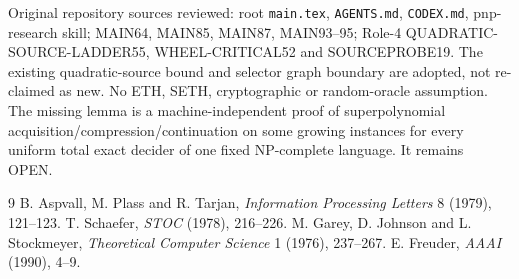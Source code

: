 \documentclass[11pt]{article}
\begin{document}
Original repository sources reviewed: root \texttt{main.tex}, \texttt{AGENTS.md}, \texttt{CODEX.md}, pnp-research skill; MAIN64, MAIN85, MAIN87, MAIN93--95; Role-4 QUADRATIC-SOURCE-LADDER55, WHEEL-CRITICAL52 and SOURCEPROBE19. The existing quadratic-source bound and selector graph boundary are adopted, not re-claimed as new. No ETH, SETH, cryptographic or random-oracle assumption. The missing lemma is a machine-independent proof of superpolynomial acquisition/compression/continuation on some growing instances for every uniform total exact decider of one fixed NP-complete language. It remains OPEN.

\begin{thebibliography}{9}
 B. Aspvall, M. Plass and R. Tarjan, \emph{Information Processing Letters} 8 (1979), 121--123.
 T. Schaefer, \emph{STOC} (1978), 216--226.
 M. Garey, D. Johnson and L. Stockmeyer, \emph{Theoretical Computer Science} 1 (1976), 237--267.
 E. Freuder, \emph{AAAI} (1990), 4--9.
\end{thebibliography}
\end{document}
